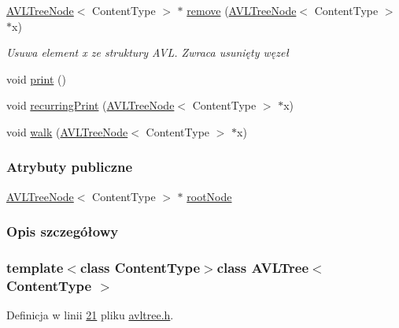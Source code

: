 \begin{DoxyCompactItemize}
\item 
\hyperlink{class_a_v_l_tree_node}{A\-V\-L\-Tree\-Node}$<$ Content\-Type $>$ $\ast$ \hyperlink{class_a_v_l_tree_ac7e22bd9f8cba3cd9eb8aea97ba7b654}{remove} (\hyperlink{class_a_v_l_tree_node}{A\-V\-L\-Tree\-Node}$<$ Content\-Type $>$ $\ast$x)
\begin{DoxyCompactList}\small\item\em Usuwa element x ze struktury A\-V\-L. Zwraca usunięty węzeł \end{DoxyCompactList}\item 
void \hyperlink{class_a_v_l_tree_ad440cb06acf157b57e161a797043aa8b}{print} ()
\item 
void \hyperlink{class_a_v_l_tree_a0440a3a88ac51df5191354562b58e375}{recurring\-Print} (\hyperlink{class_a_v_l_tree_node}{A\-V\-L\-Tree\-Node}$<$ Content\-Type $>$ $\ast$x)
\item 
void \hyperlink{class_a_v_l_tree_a3b7cf893799114e3ebca387a1910fdc8}{walk} (\hyperlink{class_a_v_l_tree_node}{A\-V\-L\-Tree\-Node}$<$ Content\-Type $>$ $\ast$x)
\end{DoxyCompactItemize}
\subsubsection*{Atrybuty publiczne}
\begin{DoxyCompactItemize}
\item 
\hyperlink{class_a_v_l_tree_node}{A\-V\-L\-Tree\-Node}$<$ Content\-Type $>$ $\ast$ \hyperlink{class_a_v_l_tree_aee3daa1b05e59d770a95e1274f09eb22}{root\-Node}
\end{DoxyCompactItemize}


\subsubsection{Opis szczegółowy}
\subsubsection*{template$<$class Content\-Type$>$class A\-V\-L\-Tree$<$ Content\-Type $>$}



Definicja w linii \hyperlink{avltree_8h_source_l00021}{21} pliku \hyperlink{avltree_8h_source}{avltree.\-h}.



